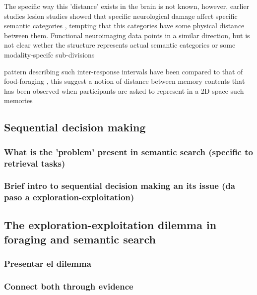 \documentclass[11pt]{article}
\begin{document}
The specific way this 'distance' exists in the brain is not known, however,
earlier studies lesion studies showed that specific neurological damage affect
specific semantic categories
\citep{hillisCATEGORYSPECIFICNAMINGCOMPREHENSION1991}, tempting that this
categories have some physical distance between them. Functional neuroimaging
data points in a similar direction, but is not clear wether the structure
represents actual semantic categories or some modality-specifc sub-divisions
\citep{caramazzaOrganizationConceptualKnowledge2003,binderWhereSemanticSystem2009}  


pattern describing such inter-response intervals have been compared to that of
food-foraging \citep{rhodesHumanMemoryRetrieval2007a}, this suggest a notion of
distance between memory contents that has been observed when participants are
asked to represent in a 2D space such memories
\citep{montezRoleSemanticClustering2015} 









\subsection{Sequential decision making}
\label{sec:org4176170}
\subsubsection{What is the 'problem' present in semantic search (specific to retrieval tasks)}
\label{sec:org653b483}
\subsubsection{Brief intro to sequential decision making an its issue (da paso a exploration-exploitation)}
\label{sec:orgdfa4cbe}
\subsection{The exploration-exploitation dilemma in foraging and semantic search}
\label{sec:orge32b91d}
\subsubsection{Presentar el dilemma}
\label{sec:org86c6828}
\subsubsection{Connect both through evidence}
\label{sec:org3f5defb}
\end{document}
